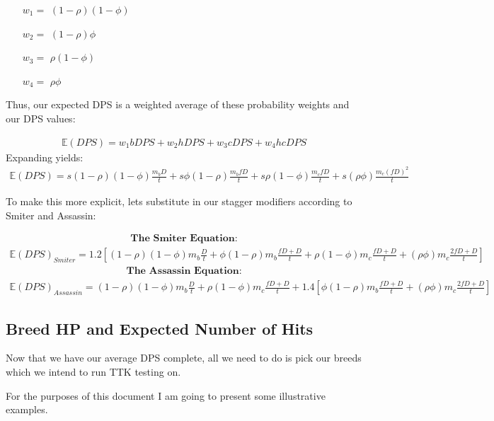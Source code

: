 \documentclass{article}
\begin{document}
\begin{enumerate}
\item[$w_1 = $] $(1-\rho) (1-\phi)$
\item[$w_2 = $] $(1-\rho) \phi$
\item[$w_3 = $] $\rho (1-\phi)$
\item[$w_4 = $] $\rho \phi$
\end{enumerate}

Thus, our expected DPS is a weighted average of these probability weights and our DPS values:

\begin{align*}
\mathbb{E}(DPS) = w_1 bDPS + w_2 hDPS + w_3 cDPS + w_4 hcDPS
\end{align*}
Expanding yields:
\begin{align*}
\mathbb{E}(DPS) = s (1-\rho) (1-\phi) \frac{m_b D}{t} + s\phi(1-\rho)\frac{m_b f D}{t} + s\rho(1-\phi) \frac{m_c f D}{t} + s (\rho \phi)\frac{m_c (f D)^2}{t}
\end{align*}


To make this more explicit, lets substitute in our stagger modifiers according to Smiter and Assassin:


\begin{align*}
\textbf{The Smiter Equation:}
\end{align*}
\begin{align*}
\boxed{ \mathbb{E}(DPS)_{Smiter} = 1.2 [(1-\rho) (1-\phi) m_b \frac{D}{t} + \phi(1-\rho) m_b \frac{ fD + D}{t} + \rho(1-\phi) m_c \frac{ fD + D}{t} + (\rho \phi) m_c \frac{2fD + D}{t} ] }
\end{align*}
\begin{align*}
\textbf{The Assassin Equation:}
\end{align*}
\begin{align*}
\boxed { \mathbb{E}(DPS)_{Assassin} = (1-\rho) (1-\phi) m_b \frac{D}{t} + \rho(1-\phi) m_c \frac{ fD + D}{t} + 1.4[ \phi(1-\rho) m_b \frac{ fD + D}{t} + (\rho \phi) m_c \frac{ 2fD + D}{t} ] }
\end{align*}

\pagebreak
\subsection{Breed HP and Expected Number of Hits}
Now that we have our average DPS complete, all we need to do is pick our breeds which we intend to run TTK testing on.

For the purposes of this document I am going to present some illustrative examples.
\end{document}
